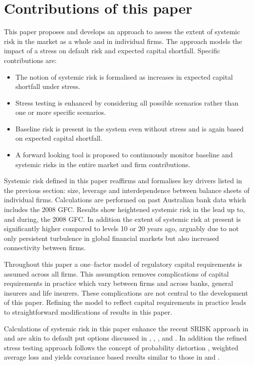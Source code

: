 \documentclass[authoryear]{elsarticle}
\newcommand{\bi}{\begin{itemize}}
\renewcommand{\i}{\item}
\newcommand{\ei}{\end{itemize}}
\begin{document}
\section{Contributions of this paper}

This paper proposes and develops an approach to assess the extent of systemic risk in the market as a whole and in individual firms.  The approach models  the impact of a stress on default risk and expected capital shortfall. Specific contributions are:
\bi
\i The notion of systemic risk is formalised as increases in expected capital shortfall under stress.

\i Stress testing is enhanced by considering all possible scenarios rather than one or more specific scenarios.

\i Baseline risk is present in the system even without stress and is again based on expected capital shortfall.

\i A forward looking tool is proposed to continuously monitor baseline and systemic risks in the entire market and firm contributions.
\ei
Systemic risk defined in this paper reaffirms and formalises key drivers listed in the previous section: size, leverage and interdependence between balance sheets of individual firms. Calculations are performed on past Australian bank data which includes the 2008 GFC. Results show heightened systemic risk in the lead up to, and during, the 2008 GFC. In addition the extent of systemic risk at present is significantly higher compared to levels 10 or 20 years ago, arguably due to not only persistent turbulence in global financial markets but also increased connectivity between firms.


Throughout this paper a one--factor model of regulatory capital requirements is assumed across all firms. This assumption removes complications of capital requirements in practice which vary between firms and across banks, general insurers and life insurers. These complications are not central to the development of this paper. Refining the model to reflect capital requirements in practice leads to straightforward modifications of results in this paper.


Calculations of systemic risk in this paper enhance the recent SRISK approach in \cite{brownlees2015} and are akin to default put options discussed in \citet{merton1977analytic}, \citet{doherty1986price}, \citet{cummins1988risk}, \citet{myers2001capital} and \citet{sherris2006solvency}. In addition the refined stress testing approach follows the concept of probability distortion \citep{wang2000class}, weighted average loss \citep{choo2009loss} and yields covariance based results similar to those in \cite{ruhm2003risk} and \cite{choo2010determining}.
\end{document}

